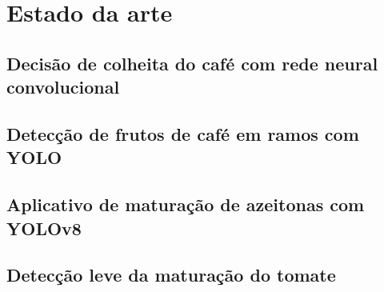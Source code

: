 \chapter{Estado da arte}\label{cap:estado-da-arte}



\section{Decisão de colheita do café com rede neural convolucional}


\section{Detecção de frutos de café em ramos com YOLO}


\section{Aplicativo de maturação de azeitonas com YOLOv8}


\section{Detecção leve da maturação do tomate}


